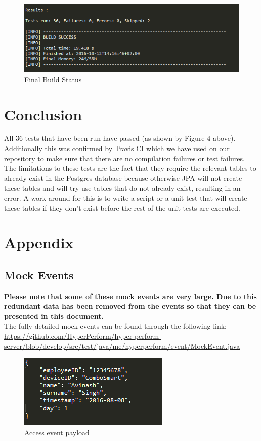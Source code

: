 \documentclass[11pt,a4paper]{article}
\begin{document}
\begin{figure}[H]
	\centering
	\includegraphics[scale=1.0]{../Images/Build_Status}
	\caption{Final Build Status}
\end{figure}

\section{Conclusion}
All 36 tests that have been run have passed (as shown by Figure 4 above). Additionally this was confirmed by Travis CI which we have used on our repository to make sure that there are no compilation failures or test failures. The limitations to these tests are the fact that they require the relevant tables to already exist in the Postgres database because otherwise JPA will not create these tables and will try use tables that do not already exist, resulting in an error. A work around for this is to write a script or a unit test that will create these tables if they don't exist before the rest of the unit tests are executed.

\newpage

\section{Appendix}

\subsection{Mock Events}
\textbf{Please note that some of these mock events are very large. Due to this redundant data has been removed from the events so that they can be presented in this document.} \\

The fully detailed mock events can be found through the following link: \url{https://github.com/HyperPerform/hyper-perform-server/blob/develop/src/test/java/me/hyperperform/event/MockEvent.java} \\

\begin{figure}[H]
	\centering
	\includegraphics[scale=1.0]{../Images/accessEvent}
	\caption{Access event payload}
\end{figure}
 
\end{document}
